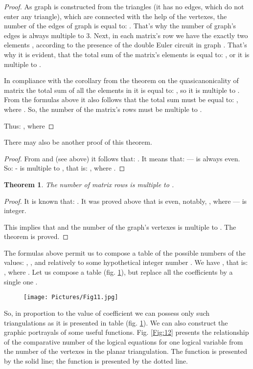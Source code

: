 \documentclass{amsart}
\newtheorem{theorem}{Theorem}
\theoremstyle{plain}
\numberwithin{equation}{section}
\begin{document}
\begin {proof}
As graph  is constructed from the triangles (it has no edges, which do not enter any triangle), which are connected with the help of the vertexes, the number of the edges of graph  is equal to: . That's why the number of graph's  edges  is always multiple to 3. Next, in each matrix's  row we have the exactly two elements , according to the presence of the double Euler circuit in graph . That's why it is evident, that the total sum of the matrix's elements is equal to: , or it is multiple to .

In compliance with the corollary from the theorem on the quasicanonicality of matrix  the total sum of all the elements in it is equal to: , so it is multiple to . From the formulas above it also follows that the total sum must be equal to: , where . So, the number of the matrix's  rows must be multiple to .

Thus: , where 
\end {proof}

There may also be another proof of this theorem.

\begin {proof}
From  and  (see above) it follows that: . It means that:  --- is always even. So:  - is multiple to , that is: , where .
\end {proof}

\begin {theorem} \label{MatrixFrows}
The number  of matrix  rows is multiple to .
\end {theorem}

\begin {proof}
It is known that: . It was proved above that  is even, notably, , where  --- is integer.
 
This implies that  and the number of the graph's  vertexes is multiple to . The theorem is proved.
\end {proof}

The formulas above permit us to compose a table of the possible numbers of the values: , ,  and  relatively to some hypothetical integer number . We have , that is: , where . Let us compose a table (fig. \ref {Fig:11}), but replace all the coefficients by a single one .

\begin{figure}[htb]
		\texttt{[image: Pictures/Fig11.jpg]}
	\caption{}
	\label{Fig:11}
\end{figure}

So, in proportion to the value of coefficient  we can possess only such triangulations as it is presented in table (fig. \ref{Fig:11}). We can also construct the graphic portrayals of some useful functions. Fig. \ref {Fig:12} presents the relationship of the comparative number of the logical equations for one logical variable from the number of the vertexes in the planar triangulation. The function  is presented by the solid line; the function  is presented by the dotted line. 
\end{document}
